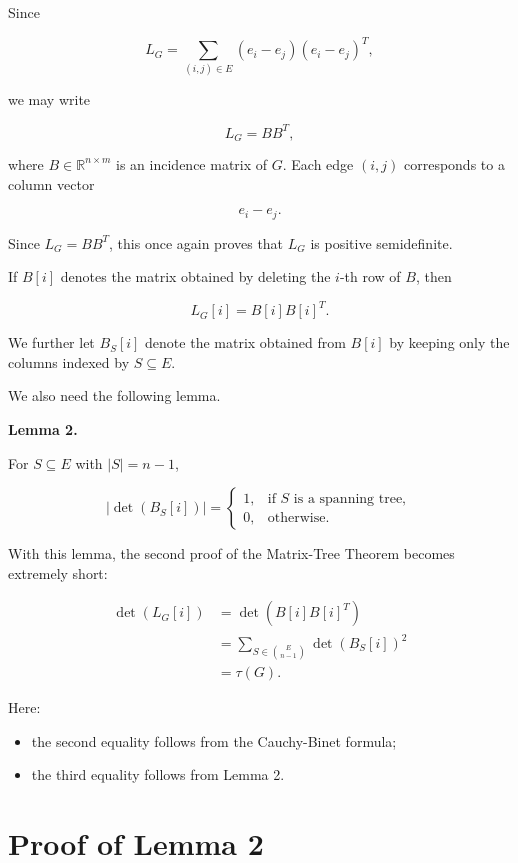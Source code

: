 \documentclass[
  a4paper,
  10pt]{article}
\providecommand{\tightlist}{%
  \setlength{\itemsep}{0pt}\setlength{\parskip}{0pt}}
\newenvironment{lemmabox}[1]
  {\par\medskip\noindent\textbf{Lemma #1.}\quad}
  {\par\medskip}
\begin{document}
Since

\[
L_G = \sum_{(i,j) \in E}(e_i - e_j)(e_i-e_j)^T,
\]

we may write

\[
L_G=BB^T,
\]

where \(B \in \mathbb{R}^{n \times m}\) is an incidence matrix of \(G\).
Each edge \((i,j)\) corresponds to a column vector

\[
e_i-e_j.
\]

Since \(L_G=BB^T\), this once again proves that \(L_G\) is positive
semidefinite.

If \(B[i]\) denotes the matrix obtained by deleting the \(i\)-th row of
\(B\), then

\[
L_G[i]=B[i]B[i]^T.
\]

We further let \(B_S[i]\) denote the matrix obtained from \(B[i]\) by
keeping only the columns indexed by \(S\subseteq E\).

We also need the following lemma.

\begin{lemmabox}{2}

For \(S \subseteq E\) with \(\lvert S\rvert = n-1\),

\[
\left|\det(B_S[i])\right|
=
\begin{cases}
1, & \text{if } S \text{ is a spanning tree},\\
0, & \text{otherwise}.
\end{cases}
\]

\end{lemmabox}

With this lemma, the second proof of the Matrix-Tree Theorem becomes
extremely short:

\[
\begin{aligned}
\det(L_G[i])
&= \det(B[i]B[i]^T) \\
&= \sum_{S\in\binom{E}{n-1}}
   \det(B_S[i])^2 \\
&= \tau(G).
\end{aligned}
\]

Here:

\begin{itemize}
\tightlist
\item
  the second equality follows from the Cauchy-Binet formula;
\item
  the third equality follows from Lemma 2.
\end{itemize}

\section{Proof of Lemma 2}\label{proof-of-lemma-2}
\end{document}
